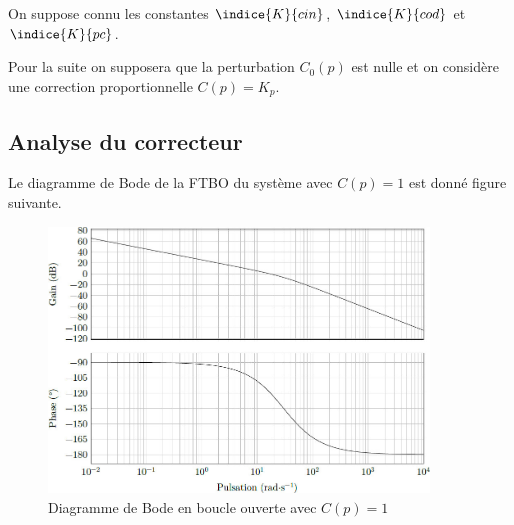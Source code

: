 On suppose connu les constantes $\indice{K}{cin}$, $\indice{K}{cod}$ et $\indice{K}{pc}$.

\ifprof
\begin{corrige}
\end{corrige}
\else
\fi

Pour la suite on supposera que la perturbation $C_0(p)$ est nulle et on considère une correction proportionnelle $C(p)=K_p$.

\ifprof
\begin{corrige}
\end{corrige}
\else
\fi

\ifprof
\begin{corrige}
\end{corrige}
\else
\fi

\subsection{Analyse du correcteur}
Le diagramme de Bode de la FTBO du système avec $C(p)=1$ est donné figure suivante. 

\begin{figure}[!htb]
\begin{center}
\includegraphics[width=0.9\textwidth]{images/image_fig18.jpg}
\caption{Diagramme de Bode en boucle ouverte avec $C(p)=1$ \label{fig18}}
\end{center}
\end{figure}

